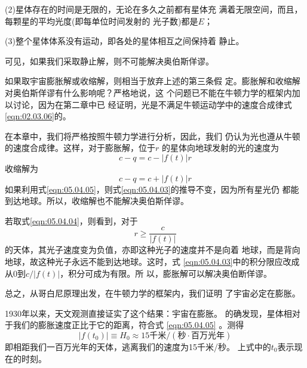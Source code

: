 (2)星体存在的时间是无限的，无论在多久之前都有星体充
满着无限空间，而且，每颗星的平均光度(即每单位时间发射的
光子数)都是$ E $；

(3)整个星体体系没有运动，即各处的星体相互之间保持着
静止。

可见，如果我们采取静止解，则不可能解决奥伯斯佯谬。

如果取宇宙膨胀解或收缩解，则相当于放弃上述的第三条假
定。膨胀解和收缩解对奥伯斯佯谬有什么影响呢？严格地说，这
个问题已不能在牛顿力学的框架内加以讨论，因为在第二章中已
经证明，光是不满足牛顿运动学中的速度合成律式\lhbrak \eqref{eqn:02.03.06}\rhbrak  的。

在本章中，我们将严格按照牛顿力学进行分析，因此，我们
仍认为光也遵从牛顿的速度合成律。这样，对于膨胀解，位于$ r $
的星体向地球发射的光的速度为
\begin{equation}\label{eqn:05.04.04}
  c - q = c - | f \left( t \right) | r
\end{equation}
收缩解为
\begin{equation}\label{eqn:05.04.05}
  c - q = c + | f \left( t \right) | r
\end{equation}
如果利用式\eqref{eqn:05.04.05}，则式\eqref{eqn:05.04.03}的推导不变，因为所有星光仍
都能到达地球。所以，收缩解也不能解决奥伯斯佯谬。

若取式\eqref{eqn:05.04.04}，则看到，对于
\begin{equation*}
  r \geqslant \frac { c } { | f \left( t \right) | }
\end{equation*}
的天体，其光子速度变为负值，亦即这种光子的速度并不是向着
地球，而是背向地球，故这种光子永远不能到达地球。这时，式
\eqref{eqn:05.04.03}中的积分限应改成从0到$  c / \left| f \left( t \right) \right| $，积分可成为有限。所
以，膨胀解可以解决奥伯断佯谬。

总之，从哥白尼原理出发，在牛顿力学的框架内，我们证明
了宇宙必定在膨胀。

1930年以来，天文观测直接证实了这个结果：宇宙在膨胀。
的确发现，星体相对于我们的膨胀速度正比于它的距离，符合式
\eqref{eqn:05.04.05} 。测得
\begin{equation}\label{eqn:05.04.06}
  \left| f \left( t _ { 0 } \right) \right| \equiv H _ { 0 } \approx 15 \text{千米}/(\text{秒}\cdot\!\text{百万光年})
\end{equation}
即相距我们一百万光年的天体，逃离我们的速度为15千米/秒。
上式中的$ t _ 0 $表示现在的时刻。

